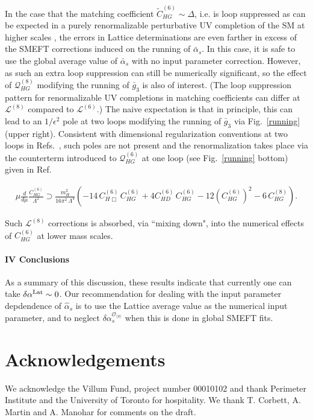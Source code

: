 \documentclass[twocolumn,nofootinbib,amsmath,amssymb,prl,aps,superscriptaddress,tightenlines,preprintnumbers]{revtex4}
\newcommand{\bea}{\begin{eqnarray}}
\newcommand{\eea}{\end{eqnarray}}
\begin{document}
In the case that the matching coefficient $\tilde{C}^{(6)}_{HG} \sim \Delta$, i.e. is loop suppressed \cite{Arzt:1994gp}
as can be expected in a purely renormalizable perturbative UV completion of the SM at higher scales \cite{Jenkins:2013fya,Craig:2019wmo},
the errors in Lattice determinations are even farther in excess of the SMEFT corrections induced on the running
of $\bar{\alpha}_s$. In this case, it is safe to use the global average value
of $\bar{\alpha}_s$ with no input parameter correction. However, as such an extra loop suppression can still
be numerically significant, so the effect of $\mathcal{Q}^{(8)}_{HG}$ modifying the running of $\bar{g}_3$
is also of interest. (The loop suppression pattern for renormalizable UV completions in matching coefficients
can differ at $\mathcal{L}^{(8)}$ \cite{Craig:2019wmo} compared to $\mathcal{L}^{(6)}$.) The naive expectation is that in principle, this can lead to an $1/\epsilon^2$ pole
at two loops modifying the running of $\bar{g}_3$ via Fig.~\ref{running} (upper right). Consistent with dimensional regularization conventions
at two loops in Refs.~\cite{tHooft:1973mfk,Jones:1974mm}, such poles are not present
and the renormalization takes place via the counterterm
introduced to $\mathcal{Q}^{(6)}_{HG}$ at one loop (see  Fig.~\ref{running} bottom) given in Ref.~\cite{Helset:2022pde}
\begin{widetext}
\bea
\mu \frac{d}{d \mu} \frac{C_{HG}^{(6)}}{\Lambda^2} \supset
\frac{m_H^2}{16 \pi^2 \, \Lambda^4} \left(- 14 \, C_{H \Box}^{(6)} \, C_{HG}^{(6)} + 4 C_{HD}^{(6)}\, C_{HG}^{(6)} - 12 (C_{HG}^{(6)})^2 - 6 \, C^{(8)}_{HG}\right).
\eea
\end{widetext}
Such $\mathcal{L}^{(8)}$ corrections is absorbed, via ``mixing down", into the numerical effects of $C_{HG}^{(6)}$
at lower mass scales.
\\
\paragraph{\bf IV Conclusions}
As a summary of this discussion, these results indicate that currently one
can take $\delta \alpha^{\rm Lat} \sim 0$. Our recommendation for dealing with
the input parameter depdendence of $\hat{\alpha}_s$ is to use
the Lattice average value as the numerical input parameter, and to neglect $\delta \alpha^{\mathcal{O}_{\langle a \rangle}}_s$
when this is done in global SMEFT fits.


\section{Acknowledgements}
We acknowledge the Villum Fund, project number 00010102
and thank Perimeter Institute and the University of Toronto for hospitality.
We thank T. Corbett, A. Martin and A. Manohar for comments on the draft.
\\
\\
\end{document}
